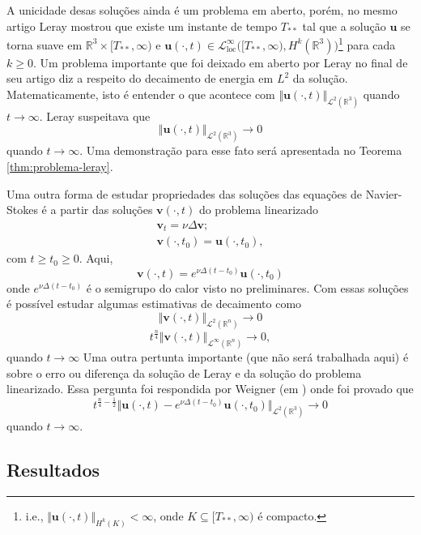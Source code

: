 \documentclass[a4paper, 11pt]{book}
\theoremstyle{definition}
\newcommand{\bR}{\mathbb{R}}
\newcommand{\bu}{\mathbf{u}}
\newcommand{\bv}{\mathbf{v}}
\newcommand{\cL}{\mathcal{L}}
\newcommand{\loc}{\mathrm{loc}}
\begin{document}
A unicidade desas soluções ainda é um problema em aberto, porém, no mesmo artigo Leray mostrou que existe um instante de tempo $T_{**}$ tal que a solução $\bu$ se torna suave em $\bR^3 \times [T_{**}, \infty)$ e $\bu(\cdot,t) \in \cL^{\infty}_{\loc}\big( [T_{**}, \infty), H^k(\bR^3) \big)$\footnote{i.e., $\Vert \bu(\cdot,t) \Vert_{H^k(K)} < \infty$, onde $K \subseteq [T_{**},\infty)$ é compacto.} para cada $k \geqslant 0$.
Um problema importante que foi deixado em aberto por Leray no final de seu artigo diz a respeito do decaimento de energia em $L^2$ da solução. Matematicamente, isto é entender o que acontece com $\Vert \bu(\cdot,t) \Vert_{\cL^2(\bR^3)}$ quando $t \to \infty$. Leray suspeitava que
\[
    \Vert \bu(\cdot,t) \Vert_{\cL^2(\bR^3)} \to 0
\]
quando $t \to \infty$. Uma demonstração para esse fato será apresentada no Teorema \ref{thm:problema-leray}.

Uma outra forma de estudar propriedades das soluções das equações de Navier-Stokes é a partir das soluções $\bv(\cdot,t)$ do problema linearizado
\[
    \begin{aligned}
        \bv_t = \nu \Delta \bv;\\
        \bv(\cdot,t_0) = \bu(\cdot,t_0),
    \end{aligned}
\]
com $t \geqslant t_0 \geqslant 0$. Aqui, 
\[
    \bv(\cdot,t) = e^{\nu \Delta (t-t_0)} \bu(\cdot,t_0)
\]
onde $e^{\nu \Delta (t-t_0)}$ é o semigrupo do calor visto no preliminares.
Com essas soluções é possível estudar algumas estimativas de decaimento como
\[
    \Vert \bv(\cdot,t) \Vert_{\cL^2(\bR^n)} \to 0
\]
\[
    t^{\frac{n}{4}}\Vert \bv(\cdot,t) \Vert_{\cL^\infty(\bR^n)} \to 0,
\]
quando $t \to \infty$
Uma outra pertunta importante (que não será trabalhada aqui) é sobre o erro ou diferença da solução de Leray e da solução do problema linearizado.
Essa pergunta foi respondida por Weigner (em \cite{wiegner-decay}) onde foi provado que
\[
    t^{\frac{n}{4} - \frac{1}{2}} \Vert \bu(\cdot,t) - e^{\nu \Delta (t-t_0)} \bu(\cdot,t_0) \Vert_{\cL^2(\bR^3)} \to 0
\]
quando $t \to \infty$.

\subsection{Resultados}
\end{document}
